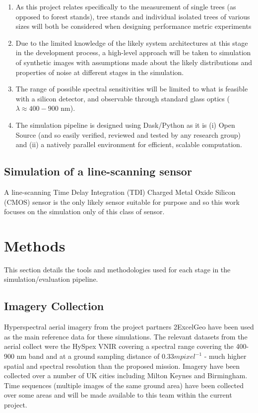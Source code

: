 \documentclass[10pt,a4paper,final,twocolumn]{article}
\begin{document}
\begin{enumerate}
\item As this project relates specifically to the measurement of single trees (as opposed to forest stands), tree stands and individual isolated trees of various sizes will both be considered when designing performance metric experiments
\item Due to the limited knowledge of the likely system architectures at this stage in the development process, a high-level approach will be taken to simulation of synthetic images with assumptions made about the likely distributions and properties of noise at different stages in the simulation.
\item The range of possible spectral sensitivities will be limited to what is feasible with a silicon detector, and observable through standard glass optics ($\lambda \approx 400 - 900$ nm).
\item The simulation pipeline is designed using Dask/Python as it is (i) Open Source (and so easily verified, reviewed and tested by any research group) and (ii) a natively parallel environment for efficient, scalable computation.
\end{enumerate}
 
\subsection{Simulation of a line-scanning sensor}
A line-scanning Time Delay Integration (TDI) Charged Metal Oxide Silicon (CMOS) sensor is the only likely sensor suitable for purpose and so this work focuses on the simulation only of this class of sensor.

\section{Methods}
This section details the tools and methodologies used for each stage in the simulation/evaluation pipeline.
\subsection{Imagery Collection}
Hyperspectral aerial imagery from the project partners 2ExcelGeo have been used as the main reference data for these simulations. The relevant datasets from the aerial collect were the HySpex VNIR covering a spectral range covering the 400-900 nm band and at a ground sampling distance of $0.33 m pixel^{-1}$ - much higher spatial and spectral resolution than the proposed mission. Imagery have been collected over a number of UK cities including Milton Keynes and Birmingham. Time sequences (multiple images of the same ground area) have been collected over some areas and will be made available to this team within the current project.
\end{document}
